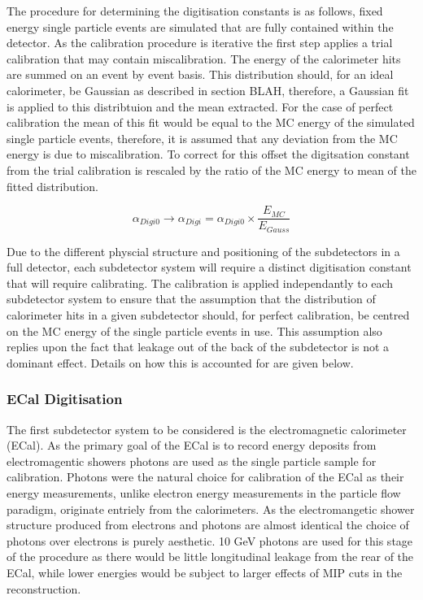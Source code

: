 The procedure for determining the digitisation constants is as follows, fixed energy single particle events are simulated that are fully contained within the detector.  As the calibration procedure is iterative the first step applies a trial calibration that may contain miscalibration.  The energy of the calorimeter hits are summed on an event by event basis.  This distribution should, for an ideal calorimeter, be Gaussian as described in section BLAH, therefore, a Gaussian fit is applied to this distribtuion and the mean extracted.  For the case of perfect calibration the mean of this fit would be equal to the MC energy of the simulated single particle events, therefore, it is assumed that any deviation from the MC energy is due to miscalibration.  To correct for this offset the digitsation constant from the trial calibration is rescaled by the ratio of the MC energy to mean of the fitted distribution.

\begin{equation}
\alpha_{Digi0} \rightarrow \alpha_{Digi} = \alpha_{Digi0} \times \frac{E_{MC}}{E_{Gauss}}
\end{equation}

Due to the different physcial structure and positioning of the subdetectors in a full detector, each subdetector system will require a distinct digitisation constant that will require calibrating.  The calibration is applied independantly to each subdetector system to ensure that the assumption that the distribution of calorimeter hits in a given subdetector should, for perfect calibration, be centred on the MC energy of the single particle events in use.  This assumption also replies upon the fact that leakage out of the back of the subdetector is not a dominant effect.  Details on how this is accounted for are given below.

\subsubsection{ECal Digitisation}

The first subdetector system to be considered is the electromagnetic calorimeter (ECal).  As the primary goal of the ECal is to record energy deposits from electromagentic showers photons are used as the single particle sample for calibration.  Photons were the natural choice for calibration of the ECal as their energy measurements, unlike electron energy measurements in the particle flow paradigm, originate entriely from the calorimeters.  As the electromangetic shower structure produced from electrons and photons are almost identical the choice of photons over electrons is purely aesthetic.  10 GeV photons are used for this stage of the procedure as there would be little longitudinal leakage from the rear of the ECal, while lower energies would be subject to larger effects of MIP cuts in the reconstruction.  

